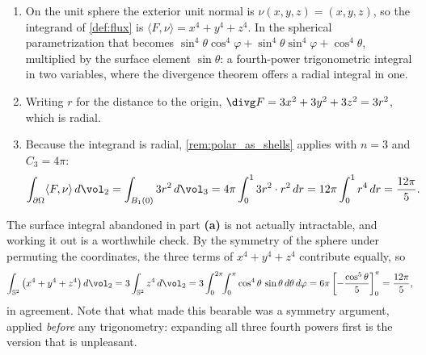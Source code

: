 
\begin{exercisesolution}
\label{sol:ai_flux_cubic_sphere}
\begin{enumerate}[label=\textbf{(\alph*)}]
  \item On the unit sphere the exterior unit normal is $\nu(x,y,z) = (x,y,z)$, so the
    integrand of \cref{def:flux} is $\langle F,\nu\rangle = x^4+y^4+z^4$. In the spherical
    parametrization that becomes
    $\sin^4\theta\cos^4\varphi + \sin^4\theta\sin^4\varphi + \cos^4\theta$, multiplied by the
    surface element $\sin\theta$: a fourth-power trigonometric integral in two variables, where
    the divergence theorem offers a radial integral in one.
  \item Writing $r$ for the distance to the origin,
    $\divg F = 3x^2+3y^2+3z^2 = 3r^2$, which is radial.
  \item Because the integrand is radial, \cref{rem:polar_as_shells} applies with $n = 3$ and
    $C_3 = 4\pi$:
    \[\int_{\partial\Omega}\langle F,\nu\rangle\,d\vol_2 = \int_{B_1(0)} 3r^2\,d\vol_3
      = 4\pi\int_0^1 3r^2\cdot r^2\,dr = 12\pi\int_0^1 r^4\,dr = \frac{12\pi}{5}.\]
\end{enumerate}

\begin{remark}
\label{rem:cubic_flux_direct_check}
The surface integral abandoned in part \textbf{(a)} is not actually intractable, and working it
out is a
worthwhile check. By the symmetry of the sphere under permuting the coordinates, the three terms
of $x^4+y^4+z^4$ contribute equally, so
\[\int_{\mathbb{S}^2}\big(x^4+y^4+z^4\big)\,d\vol_2 = 3\int_{\mathbb{S}^2} z^4\,d\vol_2
  = 3\int_0^{2\pi}\!\!\int_0^\pi \cos^4\theta\,\sin\theta\,d\theta\,d\varphi
  = 6\pi\left[-\frac{\cos^5\theta}{5}\right]_0^\pi = \frac{12\pi}{5},\]
in agreement. Note that what made this bearable was a symmetry argument, applied \emph{before}
any trigonometry: expanding all three fourth powers first is the version that is unpleasant.
\end{remark}
\end{exercisesolution}

